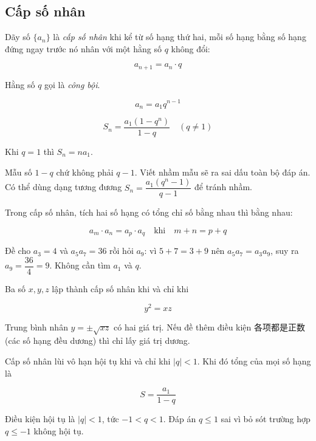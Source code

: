\documentclass[11pt, a4paper]{article}
\begin{document}
\subsection{Cấp số nhân}

\begin{dinhnghia}
Dãy số $\{a_n\}$ là \emph{cấp số nhân} khi kể từ số hạng thứ hai, mỗi số hạng bằng số hạng đứng ngay trước nó nhân với một hằng số $q$ không đổi:

$$a_{n+1} = a_n \cdot q$$

Hằng số $q$ gọi là \emph{công bội}.
\end{dinhnghia}
\begin{dinhly}
$$a_n = a_1 q^{n-1}$$
\end{dinhly}
\begin{dinhly}
$$S_n = \frac{a_1(1 - q^n)}{1 - q} \quad (q \neq 1)$$

Khi $q = 1$ thì $S_n = na_1$.

 Mẫu số $1 - q$ chứ không phải $q - 1$. Viết nhầm mẫu sẽ ra sai dấu toàn bộ đáp án. Có thể dùng dạng tương đương $S_n = \dfrac{a_1(q^n - 1)}{q - 1}$ để tránh nhầm.
\end{dinhly}
\begin{dinhly}
Trong cấp số nhân, tích hai số hạng có tổng chỉ số bằng nhau thì bằng nhau:

$$a_m \cdot a_n = a_p \cdot a_q \quad \text{khi} \quad m + n = p + q$$

 Đề cho $a_3 = 4$ và $a_5 a_7 = 36$ rồi hỏi $a_9$: vì $5 + 7 = 3 + 9$ nên $a_5 a_7 = a_3 a_9$, suy ra $a_9 = \dfrac{36}{4} = 9$. Không cần tìm $a_1$ và $q$.
\end{dinhly}
\begin{dinhly}
Ba số $x, y, z$ lập thành cấp số nhân khi và chỉ khi

$$y^2 = xz$$

 Trung bình nhân $y = \pm\sqrt{xz}$ có hai giá trị. Nếu đề thêm điều kiện 各项都是正数 (các số hạng đều dương) thì chỉ lấy giá trị dương.
\end{dinhly}
\begin{dinhly}
Cấp số nhân lùi vô hạn hội tụ khi và chỉ khi $|q| < 1$. Khi đó tổng của mọi số hạng là

$$S = \frac{a_1}{1 - q}$$

 Điều kiện hội tụ là $|q| < 1$, tức $-1 < q < 1$. Đáp án $q \le 1$ sai vì bỏ sót trường hợp $q \le -1$ không hội tụ.
\end{dinhly}
\end{document}

